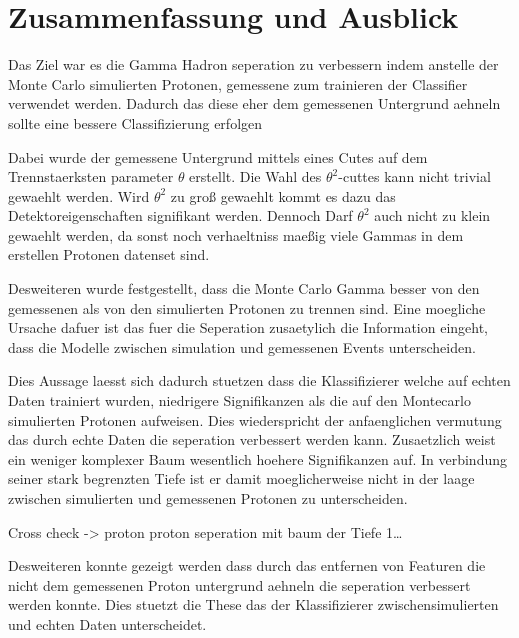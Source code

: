 \chapter{Zusammenfassung und Ausblick}
Das Ziel war es die Gamma Hadron seperation zu verbessern indem anstelle der Monte Carlo simulierten Protonen, gemessene zum trainieren der Classifier verwendet werden. 
Dadurch das diese eher dem gemessenen Untergrund aehneln sollte eine bessere Classifizierung erfolgen

Dabei wurde der gemessene Untergrund mittels eines Cutes auf dem Trennstaerksten parameter $\theta$ erstellt. 
Die Wahl des $\theta^{2}$-cuttes kann nicht trivial gewaehlt werden. 
Wird $\theta^{2}$ zu groß gewaehlt kommt es dazu das Detektoreigenschaften signifikant werden. 
Dennoch Darf $\theta^{2}$ auch nicht zu klein gewaehlt werden, da sonst noch verhaeltniss maeßig viele Gammas in dem erstellen Protonen datenset sind.

Desweiteren wurde festgestellt, dass die Monte Carlo Gamma besser von den gemessenen als von den simulierten Protonen zu trennen sind. 
Eine moegliche Ursache dafuer ist das fuer die Seperation zusaetylich die Information eingeht, dass die Modelle zwischen simulation und gemessenen Events unterscheiden.

Dies Aussage laesst sich dadurch stuetzen dass die Klassifizierer welche auf echten Daten trainiert wurden, niedrigere Signifikanzen als die auf den Montecarlo simulierten Protonen aufweisen. Dies wiederspricht der anfaenglichen vermutung das durch echte Daten die seperation verbessert werden kann. Zusaetzlich weist ein weniger komplexer Baum wesentlich hoehere Signifikanzen auf. In verbindung seiner stark begrenzten Tiefe ist er damit moeglicherweise nicht in der laage zwischen simulierten und gemessenen Protonen zu unterscheiden. 

Cross check 
-> proton proton seperation mit baum der Tiefe 1\ldots

Desweiteren konnte gezeigt werden dass durch das entfernen von Featuren die nicht dem gemessenen Proton untergrund aehneln die seperation verbessert werden konnte. Dies stuetzt die These das der Klassifizierer zwischensimulierten und echten Daten unterscheidet.
